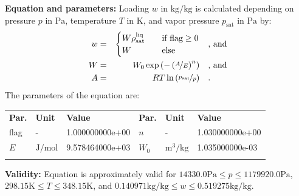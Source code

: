 \textbf{Equation and parameters:}
\newline
%
Loading $w$ in $\si{\kilogram\per\kilogram}$ is calculated depending on pressure $p$ in $\si{\pascal}$, temperature $T$ in $\si{\kelvin}$, and vapor pressure $p_\mathrm{sat}$ in $\si{\pascal}$ by:
%
\begin{equation*}
\begin{split}
w &=& \begin{cases} W \rho_\mathrm{sat}^{\mathrm{liq}} & \quad \text{if flag} \geq 0 \\ W & \quad \text{else} \end{cases} & \quad\text{, and} \\
W &=& W_0 \exp \left( - \left( \nicefrac{A}{E} \right) ^{n} \right) & \quad\text{, and} \\
A &=& R T \ln \left( \nicefrac{p_\mathrm{sat}}{p} \right) & \quad\text{.} \\
\end{split}
\end{equation*}
%
The parameters of the equation are:
%
\begin{longtable}[l]{lll|lll}
\toprule
\addlinespace
\textbf{Par.} & \textbf{Unit} & \textbf{Value} &	\textbf{Par.} & \textbf{Unit} & \textbf{Value} \\
\addlinespace
\midrule
\endhead

\bottomrule
\endfoot
\bottomrule
\endlastfoot
\addlinespace

flag & - & 1.000000000e+00 & $n$ & - & 1.030000000e+00 \\
$E$ & $\si{\joule\per\mole}$ & 9.578464000e+03 & $W_0$ & $\si{\cubic\meter\per\kilogram}$ & 1.035000000e-03 \\

\addlinespace\end{longtable}

\textbf{Validity:}
\newline
Equation is approximately valid for $14330.0 \si{\pascal} \leq p \leq 1179920.0 \si{\pascal}$,  $298.15 \si{\kelvin} \leq T \leq 348.15 \si{\kelvin}$, and $0.140971 \si{\kilogram\per\kilogram} \leq w \leq 0.519275 \si{\kilogram\per\kilogram}$.
\newline


